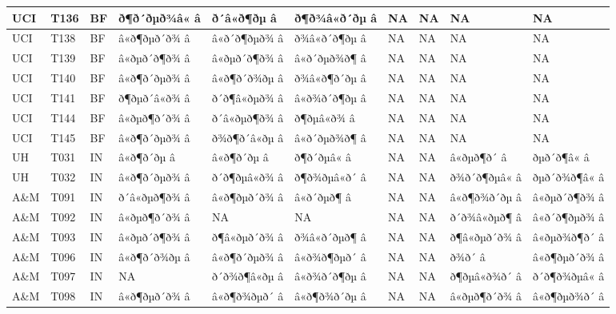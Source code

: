 \documentclass[]{article}
\begin{document}
\begin{table}[H]
\begin{tabular}{l|l|l|l|l|l|l|l|l|l}
\hline
UCI & T136 & BF & ð¶ð´ðµð¾â« â & ð´â«ð¶ðµ â & ð¶ð¾â«ð´ðµ â & NA & NA & NA & NA\\
\hline
UCI & T138 & BF & â«ð¶ðµð´ð¾ â & â«ð´ð¶ðµð¾ â & ð¾â«ð´ð¶ðµ â & NA & NA & NA & NA\\
\hline
UCI & T139 & BF & â«ðµð´ð¶ð¾ â & â«ðµð´ð¶ð¾ â & â«ð´ðµð¾ð¶ â & NA & NA & NA & NA\\
\hline
UCI & T140 & BF & â«ð¶ð´ðµð¾ â & â«ð¶ð´ð¾ðµ â & ð¾â«ð¶ð´ðµ â & NA & NA & NA & NA\\
\hline
UCI & T141 & BF & ð¶ðµð´â«ð¾ â & ð´ð¶â«ðµð¾ â & â«ð¾ð´ð¶ðµ â & NA & NA & NA & NA\\
\hline
UCI & T144 & BF & â«ðµð¶ð´ð¾ â & ð´â«ðµð¶ð¾ â & ð¶ðµâ«ð¾ â & NA & NA & NA & NA\\
\hline
UCI & T145 & BF & â«ð¶ð´ðµð¾ â & ð¾ð¶ð´â«ðµ â & â«ð´ðµð¾ð¶ â & NA & NA & NA & NA\\
\hline
UH & T031 & IN & â«ð¶ð´ðµ â & â«ð¶ð´ðµ â & ð¶ð´ðµâ« â & NA & NA & â«ðµð¶ð´ â & ðµð´ð¶â« â\\
\hline
UH & T032 & IN & â«ð¶ð´ðµð¾ â & ð´ð¶ðµâ«ð¾ â & ð¶ð¾ðµâ«ð´ â & NA & NA & ð¾ð´ð¶ðµâ« â & ðµð´ð¾ð¶â« â\\
\hline
A\&M & T091 & IN & ð´â«ðµð¶ð¾ â & â«ð¶ðµð´ð¾ â & â«ð´ðµð¶ â & NA & NA & â«ð¶ð¾ð´ðµ â & â«ðµð´ð¶ð¾ â\\
\hline
A\&M & T092 & IN & â«ðµð¶ð´ð¾ â & NA & NA & NA & NA & ð´ð¾â«ðµð¶ â & â«ð´ð¶ðµð¾ â\\
\hline
A\&M & T093 & IN & â«ðµð´ð¶ð¾ â & ð¶â«ðµð´ð¾ â & ð¾â«ð´ðµð¶ â & NA & NA & ð¶â«ðµð´ð¾ â & â«ðµð¾ð¶ð´ â\\
\hline
A\&M & T096 & IN & â«ð¶ð´ð¾ðµ â & â«ð¶ð´ðµð¾ â & â«ð¾ð¶ðµð´ â & NA & NA & ð¾ð´ â & â«ð¶ðµð´ð¾ â\\
\hline
A\&M & T097 & IN & NA & ð´ð¾ð¶â«ðµ â & â«ð¾ð´ð¶ðµ â & NA & NA & ð¶ðµâ«ð¾ð´ â & ð´ð¶ð¾ðµâ« â\\
\hline
A\&M & T098 & IN & â«ð¶ðµð´ð¾ â & â«ð¶ð¾ðµð´ â & â«ð¶ð¾ð´ðµ â & NA & NA & â«ðµð¶ð´ð¾ â & â«ð¶ðµð¾ð´ â\\

\end{tabular}
\end{table}
\end{document}
